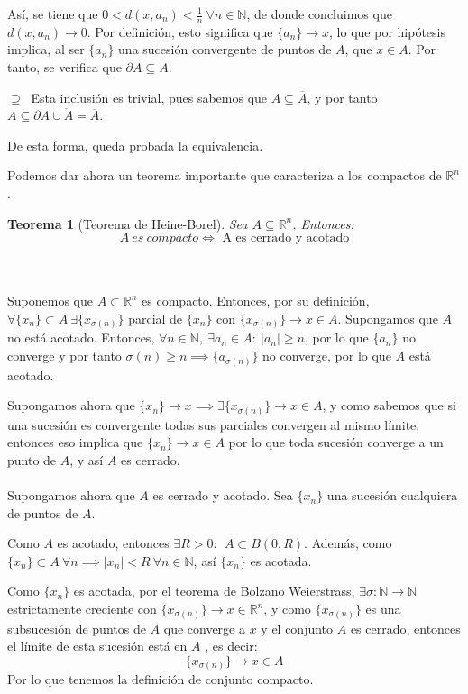 \documentclass[11pt, a4paper, titlepage]{article}
\makeatletter
\renewenvironment{proof}[1][\proofname] {\vspace{-15pt}\par\pushQED{\qed}\normalfont\topsep6\p@\@plus6\p@\relax\trivlist\item[\hskip\labelsep\it#1\@addpunct{.}]\ignorespaces}{\popQED\endtrivlist\@endpefalse}
\newcommand{\R}{\mathbb{R}}
\theoremstyle{theorem-style}
\newtheorem*{nth}{Teorema}
\theoremstyle{definition-style}
\theoremstyle{remark-style}
\theoremstyle{example-style}
\makeatother
\begin{document}
\begin{proof}
\begin{description}
Así, se tiene que $0 < d(x,a_n) < \frac{1}{n}\ \forall n\in \mathbb{N}$, de donde concluimos que $d(x,a_n) \rightarrow 0$. Por definición, esto significa que $\{a_n\} \rightarrow x$, lo que por hipótesis implica, al ser $\{a_n\}$ una sucesión convergente de puntos de $A$, que  $x\in A$. Por tanto, se verifica que $\partial A \subseteq A$.

\item $\displaystyle \boxed{\supseteq}\ $ Esta inclusión es trivial, pues sabemos que $A \subseteq \overline{A}$, y por tanto $A \subseteq \partial A \cup \mathring{A} = \overline{A}$.
\end{description}

De esta forma, queda probada la equivalencia.
\end{proof}

Podemos dar ahora un teorema importante que caracteriza a los compactos de $\R^n$.

\begin{nth}[Teorema de Heine-Borel]
Sea $A\subseteq \R^n$. Entonces:
\[
A \ es \ compacto \iff \text{ A es cerrado y acotado}
\]
\end{nth}
\begin{proof}\hfill\\
	\boxed{\Rightarrow}\\
	Suponemos que $A \subset \mathbb{R}^n$ es compacto. Entonces, por su definición, $\forall \{x_n\} \subset A \ \exists \{x_{\sigma(n)}\}$ parcial de $\{x_n\}$ con $\{x_{\sigma(n)}\} \to x \in A$. Supongamos que $A$ no está acotado. Entonces, $\forall n \in \mathbb{N}, \ \exists a_n \in A : \ |a_n| \geq n$, por lo que $\{a_n\}$ no converge y por tanto $\sigma(n) \geq n \implies \{a_{\sigma(n)}\}$ no converge, por lo que $A$ está acotado.
	
	Supongamos ahora que $\{x_n\} \to x \implies \exists \{x_{\sigma(n)}\} \to x \in A$, y como sabemos que si una sucesión es convergente todas sus parciales convergen al mismo límite, entonces eso implica que $\{x_n\}\to x \in A$ por lo que toda sucesión converge a un punto de $A$, y así $A$ es cerrado.
	\\
	\boxed{\Leftarrow}\\
	Supongamos ahora que $A$ es cerrado y acotado. Sea $\{x_n\}$ una sucesión cualquiera de puntos de $A$.
	
	Como $A$ es acotado, entonces $\exists R > 0 : \ \ A \subset B(0,R)$. Además, como $\{x_n\} \subset A \ \forall n \implies |x_n| < R \ \forall n \in \mathbb{N}$, así $\{x_n\}$ es acotada.
	
	Como $\{x_n\}$ es acotada, por el teorema de Bolzano Weierstrass, $\exists \sigma: \mathbb{N} \to \mathbb{N}$ estrictamente creciente con $\{x_{\sigma(n)}\}\to x \in \mathbb{R}^n$, y como $\{x_{\sigma(n)}\}$ es una subsucesión de puntos de $A$ que converge a $x$ y el conjunto $A$ es cerrado, entonces el límite de esta sucesión está en $A$ , es decir:
	\[
	\{x_{\sigma(n)}\}\to x \in A
	\]
Por lo que tenemos la definición de conjunto compacto.
\end{proof}
\end{document}
